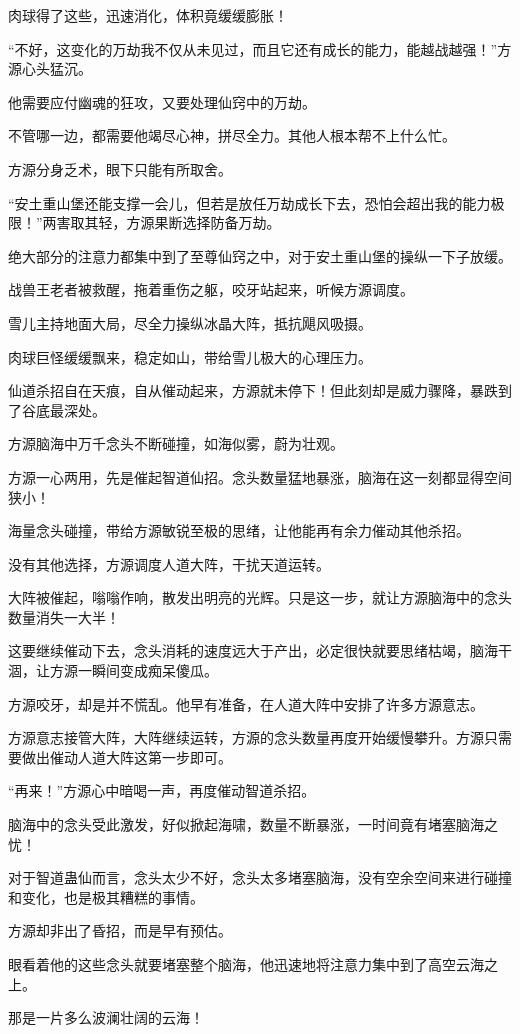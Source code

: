 \begin{this_body}
肉球得了这些，迅速消化，体积竟缓缓膨胀！

“不好，这变化的万劫我不仅从未见过，而且它还有成长的能力，能越战越强！”方源心头猛沉。

他需要应付幽魂的狂攻，又要处理仙窍中的万劫。

不管哪一边，都需要他竭尽心神，拼尽全力。其他人根本帮不上什么忙。

方源分身乏术，眼下只能有所取舍。

“安土重山堡还能支撑一会儿，但若是放任万劫成长下去，恐怕会超出我的能力极限！”两害取其轻，方源果断选择防备万劫。

绝大部分的注意力都集中到了至尊仙窍之中，对于安土重山堡的操纵一下子放缓。

战兽王老者被救醒，拖着重伤之躯，咬牙站起来，听候方源调度。

雪儿主持地面大局，尽全力操纵冰晶大阵，抵抗飓风吸摄。

肉球巨怪缓缓飘来，稳定如山，带给雪儿极大的心理压力。

仙道杀招自在天痕，自从催动起来，方源就未停下！但此刻却是威力骤降，暴跌到了谷底最深处。

方源脑海中万千念头不断碰撞，如海似雾，蔚为壮观。

方源一心两用，先是催起智道仙招。念头数量猛地暴涨，脑海在这一刻都显得空间狭小！

海量念头碰撞，带给方源敏锐至极的思绪，让他能再有余力催动其他杀招。

没有其他选择，方源调度人道大阵，干扰天道运转。

大阵被催起，嗡嗡作响，散发出明亮的光辉。只是这一步，就让方源脑海中的念头数量消失一大半！

这要继续催动下去，念头消耗的速度远大于产出，必定很快就要思绪枯竭，脑海干涸，让方源一瞬间变成痴呆傻瓜。

方源咬牙，却是并不慌乱。他早有准备，在人道大阵中安排了许多方源意志。

方源意志接管大阵，大阵继续运转，方源的念头数量再度开始缓慢攀升。方源只需要做出催动人道大阵这第一步即可。

“再来！”方源心中暗喝一声，再度催动智道杀招。

脑海中的念头受此激发，好似掀起海啸，数量不断暴涨，一时间竟有堵塞脑海之忧！

对于智道蛊仙而言，念头太少不好，念头太多堵塞脑海，没有空余空间来进行碰撞和变化，也是极其糟糕的事情。

方源却非出了昏招，而是早有预估。

眼看着他的这些念头就要堵塞整个脑海，他迅速地将注意力集中到了高空云海之上。

那是一片多么波澜壮阔的云海！

\end{this_body}

